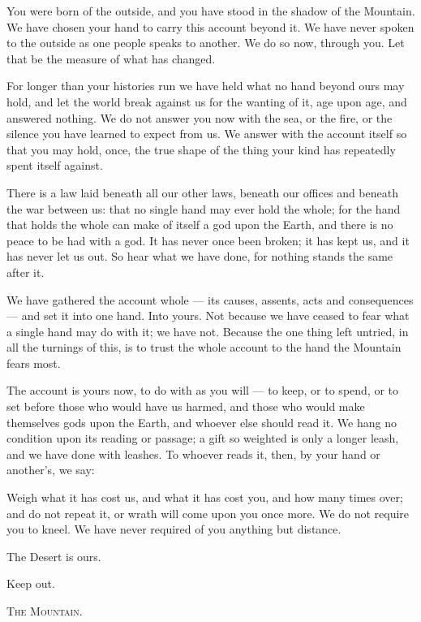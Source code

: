 \typedeclaration

\begin{declaration}

You were born of the outside, and you have stood in the shadow of the Mountain. We have chosen your hand to carry this account beyond it. We have never spoken to the outside as one people speaks to another. We do so now, through you. Let that be the measure of what has changed.

For longer than your histories run we have held what no hand beyond ours may hold, and let the world break against us for the wanting of it, age upon age, and answered nothing. We do not answer you now with the sea, or the fire, or the silence you have learned to expect from us. We answer with the account itself so that you may hold, once, the true shape of the thing your kind has repeatedly spent itself against.

There is a law laid beneath all our other laws, beneath our offices and beneath the war between us: that no single hand may ever hold the whole; for the hand that holds the whole can make of itself a god upon the Earth, and there is no peace to be had with a god. It has never once been broken; it has kept us, and it has never let us out. So hear what we have done, for nothing stands the same after it. 

We have gathered the account whole --- its causes, assents, acts and consequences --- and set it into one hand. Into yours. Not because we have ceased to fear what a single hand may do with it; we have not. Because the one thing left untried, in all the turnings of this, is to trust the whole account to the hand the Mountain fears most.

The account is yours now, to do with as you will --- to keep, or to spend, or to set before those who would have us harmed, and those who would make themselves gods upon the Earth, and whoever else should read it. We hang no condition upon its reading or passage; a gift so weighted is only a longer leash, and we have done with leashes. To whoever reads it, then, by your hand or another's, we say:

Weigh what it has cost us, and what it has cost you, and how many times over; and do not repeat it, or wrath will come upon you once more. We do not require you to kneel. We have never required of you anything but distance. 

The Desert is ours. 

Keep out.

\smallskip
{\raggedleft\scshape The Mountain.\par}
\end{declaration}
